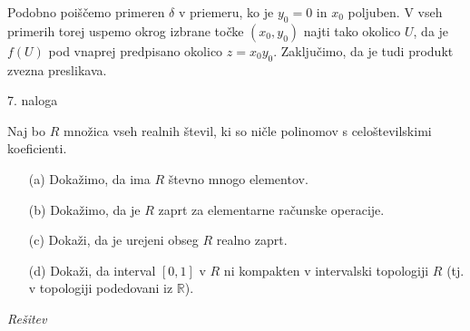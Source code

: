 \documentclass[a4paper, 12pt]{article}
\newcommand{\R}{\mathbb{R}}
\begin{document}
Podobno poiščemo primeren $\delta$  v priemeru, ko je $y_0 = 0$ in $x_0$ poljuben. 
V vseh primerih torej uspemo okrog izbrane točke $(x_0,y_0)$ najti tako okolico $U$, da je $f(U)$ pod vnaprej predpisano okolico $z = x_0 y_ 0$. Zaključimo, da je tudi produkt zvezna preslikava.


\begin{flushleft}
7. naloga
\end{flushleft}
Naj bo $R$ množica vseh realnih števil, ki so ničle polinomov s celoštevilskimi koeficienti.
\begin{enumerate}
\item[(a)] Dokažimo, da ima $R$ števno mnogo elementov.
\item[(b)] Dokažimo, da je $R$ zaprt za elementarne računske operacije.
\item[(c)] Dokaži, da je urejeni obseg $R$ realno zaprt.
\item[(d)] Dokaži, da interval $[0,1]$ v $R$ ni kompakten v intervalski topologiji $R$ (tj. v topologiji podedovani iz $\R$).
\end{enumerate}
\emph{Rešitev}
\end{document}

